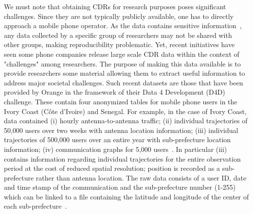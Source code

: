 We must note that obtaining CDRs for research purposes poses significant challenges. Since they are not typically publicly available, one has to directly approach a mobile phone operator. As the data contains sensitive information~\cite{de_montjoye_2013_unique}, any data collected by a specific group of researchers may not be shared with other groups, making reproducibility problematic. Yet, recent initiatives have seen some phone companies release large scale CDR data within the context of "challenges" among researchers. The purpose of making this data available is to provide researchers some material allowing them to extract useful information to address major societal challenges. Such recent datasets are those that have been provided by Orange in the framework of their Data 4 Development (D4D) challenge. These contain four anonymized tables for mobile phone users in the Ivory Coast (C{\^o}te d'Ivoire) and Senegal. For example, in the case of Ivory Coast, data contained (i) hourly antenna-to-antenna traffic; (ii) individual trajectories of 50,000 users over two weeks with antenna location information; (iii) individual trajectories of 500,000 users over an entire year with sub-prefecture location information; (iv) communication graphs for 5,000 users~\cite{blondel_2012_data}. In particular (iii) contains information regarding individual trajectories for the entire observation period at the cost of reduced spatial resolution; position is recorded as a sub-prefecture rather than antenna location. The raw data consists of a user ID, date and time stamp of the communication and the sub-prefecture number (1-255) which can be linked to a file containing the latitude and longitude of the center of each sub-prefecture~\cite{lu_2013_approaching}.
%
%
%

